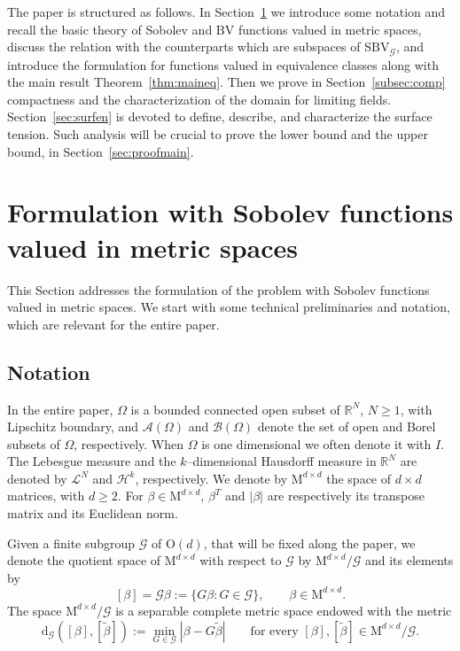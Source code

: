 \documentclass[a4paper,reqno]{amsart}
\newcommand\R{\mathbb{R}}
\newcommand{\BV}{\mathrm{BV}}
\newcommand{\SBVG}{\mathrm{SBV}_{\mathcal{G}}}
\newcommand{\dG}{\mathrm{d}_{\G}}
\newcommand\calH{\mathcal{H}}
\newcommand\calL{\mathcal{L}}
\theoremstyle{remark}
\newcommand{\EEE}{\color{black}}
\newcommand{\G}{\mathcal{G}}
\newcommand{\On}{\mathrm{O}(d)}
\newcommand{\Mno}{\mathrm{M}^{d\times d}}
\numberwithin{equation}{section}
\begin{document}
The paper is structured as follows. In Section~\ref{sec-sobolev-metric} we introduce some notation and recall the basic theory of Sobolev and $\BV$ functions valued in metric spaces, discuss the relation with the counterparts which are subspaces of $\SBVG$, and introduce the formulation for functions valued in equivalence classes along with the main result Theorem~\ref{thm:maineq}. 
Then we prove in Section~\ref{subsec:comp} compactness  and the characterization of the domain for limiting fields.  Section~\ref{sec:surfen} is devoted to  define, describe, and characterize  the surface tension.  Such analysis will be crucial 
to prove the lower bound and the upper bound, in Section~\ref{sec:proofmain}. 




\section{Formulation with Sobolev functions  valued in metric spaces}\label{sec-sobolev-metric}


This Section 
addresses the formulation of the problem with Sobolev functions valued in metric spaces.
We start with some technical preliminaries and notation, which are relevant for the entire paper.


\subsection{Notation}
In the entire paper, $\Omega$ is a bounded connected open subset of $\R^N$, $N\geq 1$,  with Lipschitz boundary, and $\mathcal{A}(\Omega)$ and $\mathcal{B}(\Omega)$ denote the set of open and  Borel \EEE subsets of $\Omega$, respectively.
When $\Omega$ is one dimensional we often denote it with $I$.
The Lebesgue measure and the $k$--dimensional  Hausdorff \EEE measure in $\R^N$ are denoted by $\calL^N$ and $\calH^{k}$, respectively.
We denote by $\mathrm{M}^{d\times d}$ the space of $d\times d$ matrices, with $d\geq 2$.
For $\beta\in\mathrm{M}^{d\times d}$, 
$\beta^T$ and $|\beta|$ are respectively its transpose matrix and  its Euclidean norm.



Given  a finite subgroup $\G$ of $\On$, that will be fixed along the paper,
we denote the quotient space of $\Mno$ with respect to $\G$ by  $\Mno/\G$ \EEE
and its elements by
\[
[\beta]=\G\beta:=\{G\beta\colon  G\in \G\}, \qquad \beta\in \Mno.
\]
The space $\Mno/\G$ is a separable complete metric space endowed with the metric
\begin{equation}
	\label{eq-metric-X}
	\dG([\beta], [\widetilde\beta]):= \min_{G\in \G} |\beta-G\widetilde\beta|\qquad \text{for every } [\beta], [\widetilde\beta]\in \Mno/\G.
\end{equation}
\end{document}
